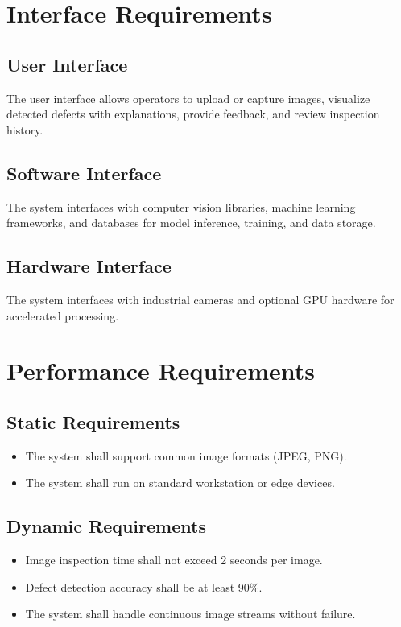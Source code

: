\documentclass[12pt,a4paper]{article}
\begin{document}
\section{Interface Requirements}

\subsection{User Interface}
The user interface allows operators to upload or capture images, visualize detected defects with explanations, provide feedback, and review inspection history.

\subsection{Software Interface}
The system interfaces with computer vision libraries, machine learning frameworks, and databases for model inference, training, and data storage.

\subsection{Hardware Interface}
The system interfaces with industrial cameras and optional GPU hardware for accelerated processing.

\section{Performance Requirements}

\subsection{Static Requirements}
\begin{itemize}
    \item The system shall support common image formats (JPEG, PNG).
    \item The system shall run on standard workstation or edge devices.
\end{itemize}

\subsection{Dynamic Requirements}
\begin{itemize}
    \item Image inspection time shall not exceed 2 seconds per image.
    \item Defect detection accuracy shall be at least 90\%.
    \item The system shall handle continuous image streams without failure.
\end{itemize}
\end{document}
